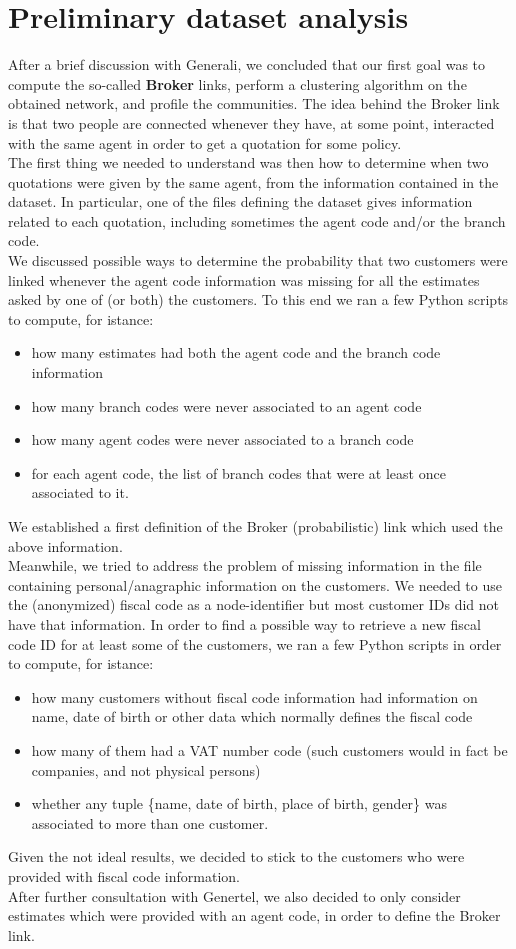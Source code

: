 \documentclass[a4paper,11pt]{book}
\begin{document}
\section{Preliminary dataset analysis}
After a brief discussion with Generali, we concluded that our first goal was to compute the so-called \textbf{Broker} links, perform a clustering algorithm on the obtained network, and profile the communities. The idea behind the Broker link is that two people are connected whenever they have, at some point, interacted with the same agent in order to get a quotation for some policy.\\
The first thing we needed to understand was then how to determine when two quotations were given by the same agent, from the information contained in the dataset. In particular, one of the files defining the dataset gives information related to each quotation, including sometimes the agent code and/or the branch code.\\
We discussed possible ways to determine the probability that two customers were linked whenever the agent code information was missing for all the estimates asked by one of (or both) the customers. To this end we ran a few Python scripts to compute, for istance:
\begin{itemize}
\item how many estimates had both the agent code and the branch code information
\item how many branch codes were never associated to an agent code
\item how many agent codes were never associated to a branch code
\item for each agent code, the list of branch codes that were at least once associated to it.
\end{itemize}
We established a first definition of the Broker (probabilistic) link which used the above information.\\

Meanwhile, we tried to address the problem of missing information in the file containing personal/anagraphic information on the customers. We needed to use the (anonymized) fiscal code as a node-identifier but most customer IDs did not have that information. In order to find a possible way to retrieve a new fiscal code ID for at least some of the customers, we ran a few Python scripts in order to compute, for istance:
\begin{itemize}
\item how many customers without fiscal code information had information on name, date of birth or other data which normally defines the fiscal code
\item how many of them had a VAT number code (such customers would in fact be companies, and not physical persons)
\item whether any tuple \{name, date of birth, place of birth, gender\} was associated to more than one customer.
\end{itemize}
Given the not ideal results, we decided to stick to the customers who were provided with fiscal code information.\\
After further consultation with Genertel, we also decided to only consider estimates which were provided with an agent code, in order to define the Broker link.
\end{document}
